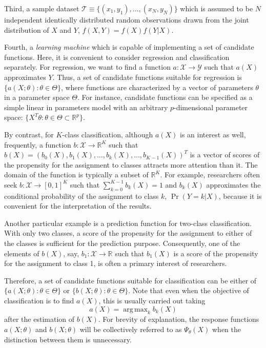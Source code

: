 \documentclass[12pt]{article}
\DeclareMathOperator*{\argmax}{arg\,max}
\begin{document}
Third, a sample dataset $\mathcal{T} \equiv \{(x_1, y_1),\dots,(x_N, y_N)\}$ which is assumed to be $N$ independent identically distributed random observations drawn from the joint distribution of $X$ and $Y$, $f(X,Y) = f(X)f(Y|X)$.

Fourth, a {\it learning machine} which is capable of implementing a set of candidate functions. Here, it is convenient to consider regression and classification separately. For regression, we want to find a function $a : \mathcal{X} \rightarrow \mathcal{Y}$ such that $a(X)$ approximates $Y$. Thus, a set of candidate functions suitable for regression is $\{a(X;\theta):\theta \in \Theta\}$, where functions are characterized by a vector of parameters $\theta$ in a parameter space $\Theta$. For instance, candidate functions can be specified as a simple linear in parameters model with an arbitrary $p$-dimensional parameter space: $\{X^T \theta: \theta \in \Theta \subset \mathbb{R}^p\}$.

By contrast, for $K$-class classification, although $a(X)$ is an interest as well, frequently, a function $b : \mathcal{X} \rightarrow \mathbb{R}^K$ such that $b(X) = (b_0(X),b_1(X),\dots,b_k(X),\dots,b_{K-1}(X))^T$ is a vector of scores of the propensity for the assignment to classes attracts more attention than it. The domain of the function is typically a subset of $\mathbb{R}^K$. For example, researchers often seek $b : \mathcal{X} \rightarrow [0,1]^K$ such that $\sum_{k=0}^{K-1} b_k(X) = 1$ and $b_k(X)$ approximates the conditional probability of the assignment to class $k$, $\Pr(Y=k|X)$, because it is convenient for the interpretation of the results.

Another particular example is a prediction function for two-class classification. With only two classes, a score of the propensity for the assignment to either of the classes is sufficient for the prediction purpose. Consequently, one of the elements of $b(X)$, say, $b_1 : \mathcal{X} \rightarrow \mathbb{R}$ such that $b_1(X)$ is a score of the propensity for the assignment to class 1, is often a primary interest of researchers.

Therefore, a set of candidate functions suitable for classification can be either of $\{a(X;\theta):\theta \in \Theta\}$ or $\{b(X;\theta):\theta \in \Theta\}$. Note that even when the objective of classification is to find $a(X)$, this is usually carried out taking
\begin{equation*}
a(X) = \argmax_k b_k(X)
\end{equation*}
after the estimation of $b(X)$. For brevity of explanation, the response functions $a(X;\theta)$ and $b(X;\theta)$ will be collectively referred to as $\Psi_{\theta}(X)$ when the distinction between them is unnecessary.
\end{document}
